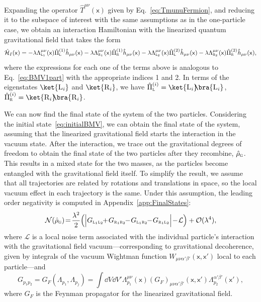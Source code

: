 \documentclass[letterpaper,12pt,titlepage,oneside,final]{book}
\newcommand{\mf}{\mathsf}%
\renewcommand{\r}{\hat{\rho}}
\newcommand{\tc}[1]{\textsc{#1}}
\begin{document}
Expanding the operator $\hat{T}^{\mu\nu}(\mf x)$ given by Eq.~\eqref{eq:TmunuFermion}, and reducing it to the subspace of interest with the same assumptions as in the one-particle case, we obtain an interaction Hamiltonian with the linearized quantum gravitational field that takes the form
\begin{equation}
    \hat{\mathcal{H}}_I(\mf x) = - \lambda \Lambda^{\mu\nu}_{\tc{l}_1}(\mf x)\hat{\Pi}^{(1)}_\tc{l}\hat{h}_{\mu\nu}(\mf x)  - \lambda \Lambda^{\mu\nu}_{\tc{r}_1}(\mf x)\hat{\Pi}^{(1)}_\tc{r}\hat{h}_{\mu\nu}(\mf x)- \lambda \Lambda^{\mu\nu}_{\tc{l}_2}(\mf x)\hat{\Pi}^{(2)}_\tc{l}\hat{h}_{\mu\nu}(\mf x) - \lambda \Lambda^{\mu\nu}_{\tc{r}_2}(\mf x)\hat{\Pi}^{(2)}_\tc{r}\hat{h}_{\mu\nu}(\mf x),
\end{equation}
where the expressions for each one of the terms above is analogous to Eq.~\eqref{eq:BMV1part} with the appropriate indices 1 and 2. In terms of the eigenstates $\ket{\tc{L}_i}$ and $\ket{\tc{R}_i}$, we have $\hat{\Pi}^{(i)}_\tc{l} = \ket{\tc{L}_i}\!\!\bra{\tc{L}_i}$, $\hat{\Pi}^{(i)}_\tc{r} = \ket{\tc{R}_i}\!\!\bra{\tc{R}_i}$.


We can now find the final state of the system of the two particles. Considering the initial state~\eqref{eq:initialBMV}, we can obtain the final state of the system, assuming that the linearized gravitational field starts the interaction in the vacuum state. After the interaction, we trace out the gravitational degrees of freedom to obtain the final state of the two particles after they recombine, $\hat{\rho}_\tc{g}$. This results in a mixed state for the two masses, as the particles become entangled with the gravitational field itself. To simplify the result, we assume that all trajectories are related by rotations and translations in space, so the local vacuum effect in each trajectory is the same. Under this assumption, the 
leading order negativity is computed in Appendix~\ref{app:FinalStates}:
\begin{align}\label{eq:Nq}
    \mathcal{N}(\r_\tc{g}) \!=\! \frac{\lambda^2}{2}\Big(\Big|G_{\tc{l}_1\tc{l}_2}\!\!+\!G_{\tc{r}_1\tc{r}_2}\!\!-\!G_{\tc{l}_1\tc{r}_2}\!\!-\!G_{\tc{r}_1\tc{l}_2}\Big|\!-\!\mathcal{L}\Big) +\mathcal{O}(\lambda^4),
\end{align}
where $\mathcal{L}$ is a local noise term associated with the individual particle's interaction with the gravitational field vacuum---corresponding to gravitational decoherence, given by integrals of the vacuum Wightman function $W_{\mu\nu\alpha'\beta'}(\mf x, \mf x')$ local to each particle---and 
\begin{equation}
    G_{p_1p_2} = G_F(\Lambda_{p_1},\Lambda_{p_j}) = \int \dd V\dd V' \Lambda_{p_1}^{\mu\nu}(\mf x) (G_F)_{\mu\nu\alpha'\beta'}(\mf x,\mf x') \Lambda_{p_2}^{\alpha'\beta'}(\mf x'),
\end{equation}
where $G_F$ is the Feynman propagator for the linearized gravitational field.
\end{document}
